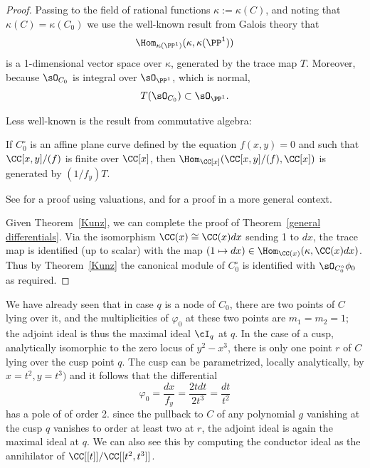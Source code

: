 \begin{proof}
Passing to the field of rational functions $\kappa := \kappa(C)$, and noting that
$\kappa(C) = \kappa(C_{0}) $ we use the well-known result from Galois theory that 
$$
\Hom_{\kappa(\PP^{1})}(\kappa, \kappa(\PP^{1}))
$$
is a 1-dimensional vector space over $\kappa$, generated by the trace map $T$. Moreover, 
because $\sO_{C_{0}}$ is integral over $\sO_{\PP^{1}}$, which is normal,
$$
T(\sO_{C_{0}})\subset \sO_{\PP^{1}}.
$$

Less well-known is the result from commutative
algebra:

\begin{theorem}\label{Kunz}
If $C_{0}^{\circ}$ is an affine plane curve defined by the
equation $f(x,y)=0$ and such that $\CC[x,y]/(f)$ is finite over $\CC[x]$,
then $\Hom_{\CC[x]}(\CC[x,y]/(f), \CC[x])$ is generated by $(1/f_{y})T$.
\end{theorem}

See \cite[Theorem 15.1]{Kunz} for a proof using valuations, and \cite[Theorem A.1]{MR4026452} for a proof in
a more general context.

Given Theorem~\ref{Kunz}, we can complete the proof of Theorem~\ref{general differentials}. Via the isomorphism $\CC(x) \cong \CC(x)dx$ sending 1 to $dx$, the trace map is identified (up to scalar)
with the map $(1\mapsto dx) \in \Hom_{\CC(x)}(\kappa, \CC(x)dx)$. Thus by Theorem~\ref{Kunz}
the canonical module of $C_{0}^{\circ}$ is identified with $\sO_{C_{0}^\circ} \phi_{0}$ as
required.
\end{proof}




\begin{example}
We have already seen that in case $q$ is a node of $C_0$, there are two points of $C$ lying over it, and the multiplicities of $\varphi_0$ at these two points are $m_1=m_2=1$; the adjoint ideal is thus 
 the maximal ideal $\cI_q$ at $q$. In the case of a cusp, analytically isomorphic to the zero locus of $y^2-x^3$, there is only one point $r$ of $C$ lying over the cusp point $q$. The cusp can be parametrized, locally analytically,
 by $x = t^{2}, y = t^{3})$ and it follows that the differential 
 $$
 \varphi_0 = \frac{dx}{f_{y}} =  \frac{2tdt}{2t^{3}} =  \frac{dt}{t^{2}}
 $$ 
 has a pole of of order 2. since the pullback to $C$ of any polynomial $g$ vanishing at the cusp $q$ vanishes to order at least two at $r$, the adjoint ideal is again the maximal ideal at $q$. We can also see this by computing the
 conductor ideal as the annihilator of $\CC[[t]]/\CC[[t^{2}, t^{3}]]$.
\end{example}

